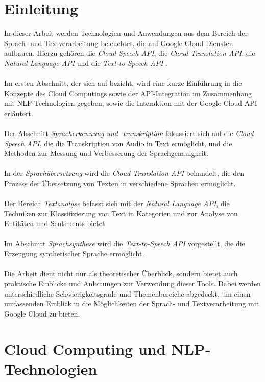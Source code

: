 \documentclass[12pt,a4paper]{article}
\begin{document}
\section*{Einleitung}
In dieser Arbeit werden Technologien und Anwendungen aus dem Bereich der Sprach- und Textverarbeitung beleuchtet, die auf Google Cloud-Diensten aufbauen. Hierzu gehören die \textit{Cloud Speech API}, die \textit{Cloud Translation API}, die \textit{Natural Language API} und die \textit{Text-to-Speech API} \cite{googlecloudskills2023}.
\\ \\
Im ersten Abschnitt, der sich auf \cite{giefers2023cloud} bezieht, wird eine kurze Einführung in die Konzepte des Cloud Computings sowie der API-Integration im Zusammenhang mit NLP-Technologien gegeben, sowie die Interaktion mit der Google Cloud API erläutert.
\\ \\
Der Abschnitt \textit{Spracherkennung und -transkription} fokussiert sich auf die \textit{Cloud Speech API}, die die Transkription von Audio in Text ermöglicht, und die Methoden zur Messung und Verbesserung der Sprachgenauigkeit.
\\ \\
In der \textit{Sprachübersetzung} wird die \textit{Cloud Translation API} behandelt, die den Prozess der Übersetzung von Texten in verschiedene Sprachen ermöglicht.
\\ \\
Der Bereich \textit{Textanalyse} befasst sich mit der \textit{Natural Language API}, die Techniken zur Klassifizierung von Text in Kategorien und zur Analyse von Entitäten und Sentiments bietet.
\\ \\
Im Abschnitt \textit{Sprachsynthese} wird die \textit{Text-to-Speech API} vorgestellt, die die Erzeugung synthetischer Sprache ermöglicht.
\\ \\
Die Arbeit dient nicht nur als theoretischer Überblick, sondern bietet auch praktische Einblicke und Anleitungen zur Verwendung dieser Tools. Dabei werden unterschiedliche Schwierigkeitsgrade und Themenbereiche abgedeckt, um einen umfassenden Einblick in die Möglichkeiten der Sprach- und Textverarbeitung mit Google Cloud zu bieten.

	
\newpage

\section{Cloud Computing und NLP-Technologien}
\end{document}
